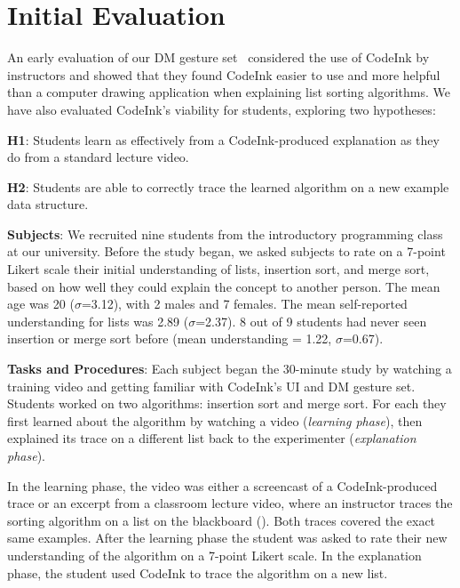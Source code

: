 \section{Initial Evaluation}

An early evaluation of our DM gesture set~\cite{Scott2014} considered the use of CodeInk by instructors and showed
that they found CodeInk easier to use and more helpful than a
computer drawing application when explaining list sorting algorithms. We have also evaluated CodeInk's
viability for students, exploring two hypotheses:

\noindent \textbf{H1}: Students learn as effectively from a
CodeInk-produced explanation as they do from a standard lecture video.

\noindent \textbf{H2}: Students are able to correctly trace the learned
algorithm on a new example data structure.

\noindent \textbf{Subjects}: We recruited nine students from the
introductory programming class at our university. Before the study
began, we asked subjects to rate on a 7-point Likert scale their initial understanding of lists,
insertion sort, and merge sort, based on how
well they could explain the concept to another person. The mean age was
20 ($\sigma$=3.12), with 2 males and 7 females. The mean self-reported
understanding for lists was 2.89 ($\sigma$=2.37). 8 out of 9 students
had never seen insertion or merge sort before (mean understanding =
1.22, $\sigma$=0.67).

\noindent \textbf{Tasks and Procedures}: Each subject began the
30-minute study by watching a training video and getting familiar with
CodeInk's UI and DM gesture set. Students worked on two algorithms: insertion sort and merge sort. For each they first 
learned about the algorithm by watching a video ({\em learning phase}),
then explained its trace on a different list back to the
experimenter ({\em explanation phase}).

In the learning phase, the video was either a screencast of a
CodeInk-produced trace or an excerpt from a classroom lecture
video, where an instructor traces the sorting algorithm on a 
list on the blackboard (). Both 
traces covered the exact same examples. After the learning 
phase the student was asked to rate their new understanding of the
algorithm on a 7-point Likert scale. In the explanation phase, the
student used CodeInk to trace the algorithm on a new list.

